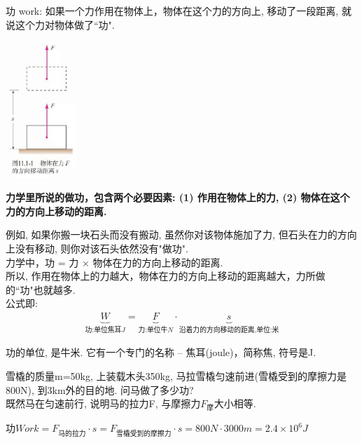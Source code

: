 \documentclass[UTF8]{ctexart}
\begin{document}
功 work: 如果一个力作用在物体上，物体在这个力的方向上, 移动了一段距离, 就说这个力对物体做了``功".

\includegraphics[width=0.2\textwidth]{img/0045.png}

\textbf{力学里所说的做功，包含两个必要因素: (1) 作用在物体上的力, (2) 物体在这个力的方向上移动的距离.}

例如, 如果你搬一块石头而没有搬动, 虽然你对该物体施加了力, 但石头在力的方向上没有移动, 则你对该石头依然没有"做功". \\

力学中，功 = 力 × 物体在力的方向上移动的距离. \\
所以, 作用在物体上的力越大，物体在力的方向上移动的距离越大，力所做的``功"也就越多. \\

公式即:
\begin{align*}
	\boxed{
		\underset{\text{功:单位焦耳}J}{\underbrace{W}}=\underset{\text{力:单位牛}N}{\underbrace{F}}\cdot \underset{\text{沿着力的方向移动的距离,单位:米}}{\underbrace{s}}		
	}
\end{align*}

功的单位, 是牛米. 它有一个专门的名称 -- 焦耳(joule)，简称焦, 符号是J. \\



\begin{tcolorbox}[title = {例},boxrule={0.1em},colframe={black!10}, colback={black!3},colbacktitle={black!10},coltitle={black}]
雪橇的质量m=50kg, 上装载木头350kg, 马拉雪橇匀速前进(雪橇受到的摩擦力是800N), 到3km外的目的地. 问马做了多少功? \\
既然马在匀速前行, 说明马的拉力F, 与摩擦力$F_摩$大小相等.

$
\text{功}Work=F_{\text{马的拉力}}\cdot s=F_{\text{雪橇受到的摩擦力}}\cdot s=800N\cdot 3000m=2.4\times 10^6J
$
\end{tcolorbox}
	
	\vspace{1em} 
	
\end{document}
